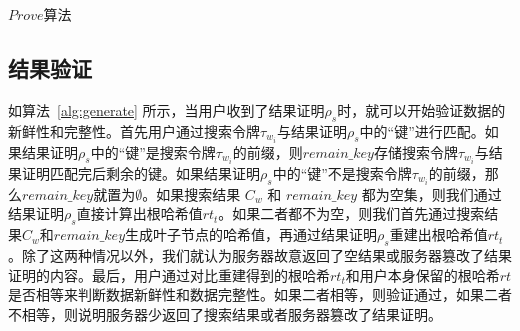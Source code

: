 \begin{algorithm}[ht]
  \caption{$Prove$算法}
  \label{alg:Prove}
  \begin{algorithmic}[1]
                  \ELSE
                  \ENDIF
                \ENDFOR
              \ELSE %
                \ENDFOR
              \ENDIF
  \end{algorithmic}
\end{algorithm}

\subsection{结果验证}

如算法~\ref{alg:generate} 所示，当用户收到了结果证明$\rho_s$时，就可以开始验证数据的新鲜性和完整性。首先用户通过搜索令牌$\tau_{w_i}$与结果证明$\rho_s$中的“键”进行匹配。如果结果证明$\rho_s$中的“键”是搜索令牌$\tau_{w_i}$的前缀，则$remain\_key$存储搜索令牌$\tau_{w_i}$与结果证明匹配完后剩余的键。如果结果证明$\rho_s$中的“键”不是搜索令牌$\tau_{w_i}$的前缀，那么$remain\_key$就置为$\emptyset$。如果搜索结果 $C_{w}$ 和 $remain\_key$ 都为空集，则我们通过结果证明$\rho_s$直接计算出根哈希值$rt_t$。如果二者都不为空，则我们首先通过搜索结果$C_{w}$和$remain\_key$生成叶子节点的哈希值，再通过结果证明$\rho_s$重建出根哈希值$rt_t$。除了这两种情况以外，我们就认为服务器故意返回了空结果或服务器篡改了结果证明的内容。最后，用户通过对比重建得到的根哈希$rt_t$和用户本身保留的根哈希$rt$是否相等来判断数据新鲜性和数据完整性。如果二者相等，则验证通过，如果二者不相等，则说明服务器少返回了搜索结果或者服务器篡改了结果证明。

